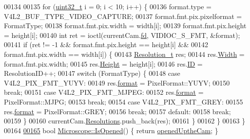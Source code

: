 \begin{DoxyCode}
00134 
00135   \textcolor{keywordflow}{for} (\hyperlink{_soil_math_types_8h_a435d1572bf3f880d55459d9805097f62}{uint32\_t} i = 0; i < 10; i++) \{
00136     format.type = V4L2\_BUF\_TYPE\_VIDEO\_CAPTURE;
00137     format.fmt.pix.pixelformat = FormatType;
00138     format.fmt.pix.width = width[i];
00139     format.fmt.pix.height = height[i];
00140     \textcolor{keywordtype}{int} ret = ioctl(currentCam.\hyperlink{struct_hardware_1_1_microscope_1_1_cam__t_ab8d692f05f97f5f3cc0401f750d9ad2e}{fd}, VIDIOC\_S\_FMT, &format);
00141     \textcolor{keywordflow}{if} (ret != -1 && format.fmt.pix.height == height[i] &&
00142         format.fmt.pix.width == width[i]) \{
00143       \hyperlink{struct_hardware_1_1_microscope_1_1_resolution__t}{Resolution\_t} res;
00144       res.\hyperlink{struct_hardware_1_1_microscope_1_1_resolution__t_a806e65c6ee59267a6a1c312c61a905dd}{Width} = format.fmt.pix.width;
00145       res.\hyperlink{struct_hardware_1_1_microscope_1_1_resolution__t_a0f56bb68dbaf77d47159e46d5384ee60}{Height} = height[i];
00146       res.\hyperlink{struct_hardware_1_1_microscope_1_1_resolution__t_a953e7a65311a4861b6db47b4faf74d4e}{ID} = ResolutionID++;
00147       \textcolor{keywordflow}{switch} (FormatType) \{
00148       \textcolor{keywordflow}{case} V4L2\_PIX\_FMT\_YUYV:
00149         res.\hyperlink{struct_hardware_1_1_microscope_1_1_resolution__t_a541b9faa798790e33aa42391d4b451b7}{format} = PixelFormat::YUYV;
00150         \textcolor{keywordflow}{break};
00151       \textcolor{keywordflow}{case} V4L2\_PIX\_FMT\_MJPEG:
00152         res.\hyperlink{struct_hardware_1_1_microscope_1_1_resolution__t_a541b9faa798790e33aa42391d4b451b7}{format} = PixelFormat::MJPG;
00153         \textcolor{keywordflow}{break};
00154       \textcolor{keywordflow}{case} V4L2\_PIX\_FMT\_GREY:
00155         res.\hyperlink{struct_hardware_1_1_microscope_1_1_resolution__t_a541b9faa798790e33aa42391d4b451b7}{format} = PixelFormat::GREY;
00156         \textcolor{keywordflow}{break};
00157       \textcolor{keywordflow}{default}:
00158         \textcolor{keywordflow}{break};
00159       \}
00160       currentCam.\hyperlink{struct_hardware_1_1_microscope_1_1_cam__t_a28496beff27af86c6305e0dd950001e9}{Resolutions}.push\_back(res);
00161     \}
00162   \}
00163 \}
00164 
\hypertarget{_microscope_8cpp_source_l00165}{}\hyperlink{class_hardware_1_1_microscope_ae799dbdff39787d3226e8e8ce25386de}{00165} \textcolor{keywordtype}{bool} \hyperlink{class_hardware_1_1_microscope_ae799dbdff39787d3226e8e8ce25386de}{Microscope::IsOpened}() \{ \textcolor{keywordflow}{return} \hyperlink{class_hardware_1_1_microscope_ab1033afe167ab113639ea90c6b66544f}{openedUptheCam}; \}

\end{DoxyCode}
